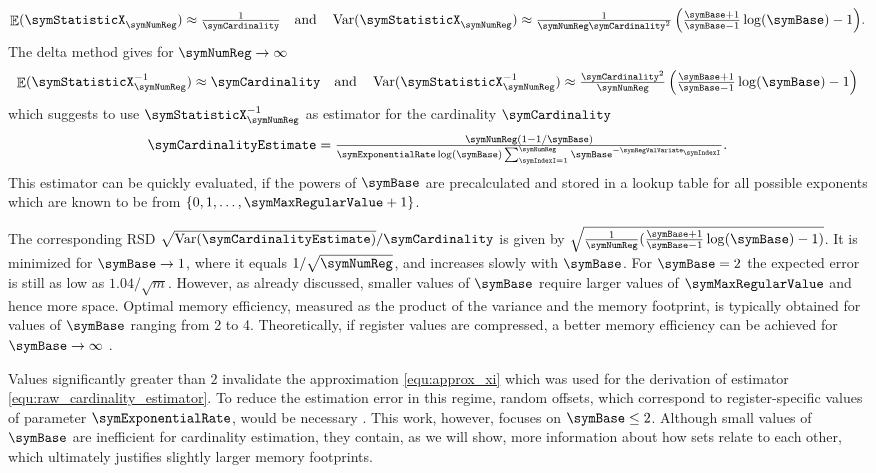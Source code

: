 \documentclass[sigconf, nonacm]{acmart}
\DeclareMathOperator*{\symVariance}{Var}
\DeclareMathOperator*{\symExpectation}{\mathbb{E}}
\begin{document}
\begin{equation*}
{\textstyle
\symExpectation(\symStatisticX_\symNumReg) \approx \frac{1}{\symCardinality}
\quad
\textnormal{and}
\quad
\symVariance(\symStatisticX_\symNumReg) \approx \frac{1}{\symNumReg\symCardinality^2}\left(\frac{\symBase+1}{\symBase-1}\log(\symBase) - 1\right)}.
\end{equation*}
The delta method \cite{Casella2002} gives for $\symNumReg\rightarrow\infty$ 
\begin{equation*}
{\textstyle
\symExpectation(\symStatisticX_\symNumReg^{-1}) \approx \symCardinality
\quad
\textnormal{and}
\quad
\symVariance(\symStatisticX_\symNumReg^{-1}) \approx \frac{\symCardinality^2}{\symNumReg}\left(\frac{\symBase+1}{\symBase-1}\log(\symBase) - 1\right)}
\end{equation*}
which suggests to use $\symStatisticX_\symNumReg^{-1}$ as estimator for the cardinality $\symCardinality$
\begin{equation}
\label{equ:raw_cardinality_estimator}
\textstyle\symCardinalityEstimate
=
\frac{\symNumReg(1-1/\symBase)}{\symExponentialRate\log(\symBase)\sum_{\symIndexI=1}^\symNumReg  \symBase^{-\symRegValVariate_\symIndexI}}.
\end{equation}
This estimator can be quickly evaluated, if the powers of $\symBase$ are precalculated and stored in a lookup table for all possible exponents which are known to be from $\lbrace 0,1,\ldots,\symMaxRegularValue+1\rbrace$. 

The corresponding \ac{RSD} $\sqrt{\symVariance(\symCardinalityEstimate)}/\symCardinality$ is given by $\sqrt{\frac{1}{\symNumReg}(\frac{\symBase+1}{\symBase-1}\log(\symBase) - 1)}$. It is minimized for $\symBase\rightarrow 1$, where it equals $1/\sqrt{\symNumReg}$, and increases slowly with $\symBase$. For $\symBase=2$ the expected error is still as low as $1.04/\sqrt{m}$. However, as already discussed, smaller values of $\symBase$ require larger values of $\symMaxRegularValue$ and hence more space. Optimal memory efficiency, measured as the product of the variance and the memory footprint, is typically obtained for values of $\symBase$ ranging from 2 to 4. Theoretically, if register values are compressed, a better memory efficiency can be achieved for $\symBase\rightarrow\infty$ \cite{Pettie2020}.

Values significantly greater than $2$ invalidate the approximation \eqref{equ:approx_xi} which was used for the derivation of estimator \eqref{equ:raw_cardinality_estimator}. To reduce the estimation error in this regime, random offsets, which correspond to register-specific values of parameter $\symExponentialRate$, would be necessary \cite{Pettie2020, Lukasiewicz2020}. 
This work, however, focuses on $\symBase\leq 2$. Although small values of $\symBase$ are inefficient for cardinality estimation, they contain, as we will show, more information about how sets relate to each other, which ultimately justifies slightly larger memory footprints.
\end{document}
